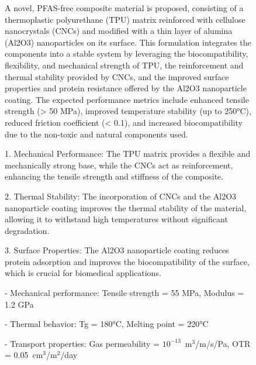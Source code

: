 \begin{figure}[htbp]
  \begin{mdframed}[
    frametitle={Generated Hypothesis as a Result of Top-N Shortest Simple Path Algorithm (N=5)},
    frametitlefont=\bfseries\sffamily\small,
    backgroundcolor=white,
    linecolor=black,
    linewidth=0.5pt,
    innerleftmargin=6pt,
    innerrightmargin=6pt,
    innertopmargin=6pt,
    innerbottommargin=6pt
  ]
    \ttfamily\scriptsize
    
    \textbf{}
    
    A novel, PFAS-free composite material is proposed, consisting of a thermoplastic polyurethane (TPU) matrix reinforced with cellulose nanocrystals (CNCs) and modified with a thin layer of alumina (Al2O3) nanoparticles on its surface. This formulation integrates the components into a stable system by leveraging the biocompatibility, flexibility, and mechanical strength of TPU, the reinforcement and thermal stability provided by CNCs, and the improved surface properties and protein resistance offered by the Al2O3 nanoparticle coating. The expected performance metrics include enhanced tensile strength (> 50 MPa), improved temperature stability (up to 250°C), reduced friction coefficient (< 0.1), and increased biocompatibility due to the non-toxic and natural components used.
    
    \textbf{}
    
    1. Mechanical Performance: The TPU matrix provides a flexible and mechanically strong base, while the CNCs act as reinforcement, enhancing the tensile strength and stiffness of the composite.
    
    2. Thermal Stability: The incorporation of CNCs and the Al2O3 nanoparticle coating improves the thermal stability of the material, allowing it to withstand high temperatures without significant degradation.
    
    3. Surface Properties: The Al2O3 nanoparticle coating reduces protein adsorption and improves the biocompatibility of the surface, which is crucial for biomedical applications.
    
    \textbf{}
    
    - Mechanical performance: Tensile strength = 55 MPa, Modulus = 1.2 GPa
    
    - Thermal behavior: Tg = 180°C, Melting point = 220°C
    
    - Transport properties: Gas permeability = $10^{-13}$~m$^3$/m/s/Pa, OTR = 0.05~cm$^3$/m$^2$/day
    

\end{mdframed}
\end{figure}
